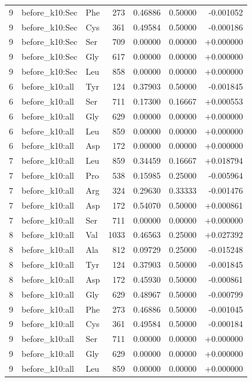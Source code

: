 \begin{longtable}{r l l r r r r}
9 & before\_k10:Sec & Phe & 273 & 0.46886 & 0.50000 & -0.001052 \\
9 & before\_k10:Sec & Cys & 361 & 0.49584 & 0.50000 & -0.000186 \\
9 & before\_k10:Sec & Ser & 709 & 0.00000 & 0.00000 & +0.000000 \\
9 & before\_k10:Sec & Gly & 617 & 0.00000 & 0.00000 & +0.000000 \\
9 & before\_k10:Sec & Leu & 858 & 0.00000 & 0.00000 & +0.000000 \\
6 & before\_k10:all & Tyr & 124 & 0.37903 & 0.50000 & -0.001845 \\
6 & before\_k10:all & Ser & 711 & 0.17300 & 0.16667 & +0.000553 \\
6 & before\_k10:all & Gly & 629 & 0.00000 & 0.00000 & +0.000000 \\
6 & before\_k10:all & Leu & 859 & 0.00000 & 0.00000 & +0.000000 \\
6 & before\_k10:all & Asp & 172 & 0.00000 & 0.00000 & +0.000000 \\
7 & before\_k10:all & Leu & 859 & 0.34459 & 0.16667 & +0.018794 \\
7 & before\_k10:all & Pro & 538 & 0.15985 & 0.25000 & -0.005964 \\
7 & before\_k10:all & Arg & 324 & 0.29630 & 0.33333 & -0.001476 \\
7 & before\_k10:all & Asp & 172 & 0.54070 & 0.50000 & +0.000861 \\
7 & before\_k10:all & Ser & 711 & 0.00000 & 0.00000 & +0.000000 \\
8 & before\_k10:all & Val & 1033 & 0.46563 & 0.25000 & +0.027392 \\
8 & before\_k10:all & Ala & 812 & 0.09729 & 0.25000 & -0.015248 \\
8 & before\_k10:all & Tyr & 124 & 0.37903 & 0.50000 & -0.001845 \\
8 & before\_k10:all & Asp & 172 & 0.45930 & 0.50000 & -0.000861 \\
8 & before\_k10:all & Gly & 629 & 0.48967 & 0.50000 & -0.000799 \\
9 & before\_k10:all & Phe & 273 & 0.46886 & 0.50000 & -0.001045 \\
9 & before\_k10:all & Cys & 361 & 0.49584 & 0.50000 & -0.000184 \\
9 & before\_k10:all & Ser & 711 & 0.00000 & 0.00000 & +0.000000 \\
9 & before\_k10:all & Gly & 629 & 0.00000 & 0.00000 & +0.000000 \\
9 & before\_k10:all & Leu & 859 & 0.00000 & 0.00000 & +0.000000 \\
\bottomrule
\end{longtable}
\endgroup


